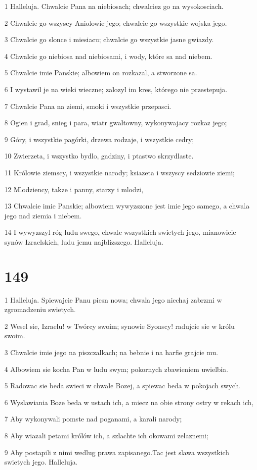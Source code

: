 \par 1 Halleluja. Chwalcie Pana na niebiosach; chwalciez go na wysokosciach.
\par 2 Chwalcie go wszyscy Aniolowie jego; chwalcie go wszystkie wojska jego.
\par 3 Chwalcie go slonce i miesiacu; chwalcie go wszystkie jasne gwiazdy.
\par 4 Chwalcie go niebiosa nad niebiosami, i wody, które sa nad niebem.
\par 5 Chwalcie imie Panskie; albowiem on rozkazal, a stworzone sa.
\par 6 I wystawil je na wieki wieczne; zalozyl im kres, którego nie przestepuja.
\par 7 Chwalcie Pana na ziemi, smoki i wszystkie przepasci.
\par 8 Ogien i grad, snieg i para, wiatr gwaltowny, wykonywajacy rozkaz jego;
\par 9 Góry, i wszystkie pagórki, drzewa rodzaje, i wszystkie cedry;
\par 10 Zwierzeta, i wszystko bydlo, gadziny, i ptastwo skrzydlaste.
\par 11 Królowie ziemscy, i wszystkie narody; ksiazeta i wszyscy sedziowie ziemi;
\par 12 Mlodziency, takze i panny, starzy i mlodzi,
\par 13 Chwalcie imie Panskie; albowiem wywyzszone jest imie jego samego, a chwala jego nad ziemia i niebem.
\par 14 I wywyzszyl róg ludu swego, chwale wszystkich swietych jego, mianowicie synów Izraelskich, ludu jemu najblizszego. Halleluja.

\chapter{149}

\par 1 Halleluja. Spiewajcie Panu piesn nowa; chwala jego niechaj zabrzmi w zgromadzeniu swietych.
\par 2 Wesel sie, Izraelu! w Twórcy swoim; synowie Syonscy! radujcie sie w królu swoim.
\par 3 Chwalcie imie jego na piszczalkach; na bebnie i na harfie grajcie mu.
\par 4 Albowiem sie kocha Pan w ludu swym; pokornych zbawieniem uwielbia.
\par 5 Radowac sie beda swieci w chwale Bozej, a spiewac beda w pokojach swych.
\par 6 Wyslawiania Boze beda w ustach ich, a miecz na obie strony ostry w rekach ich,
\par 7 Aby wykonywali pomste nad poganami, a karali narody;
\par 8 Aby wiazali petami królów ich, a szlachte ich okowami zelaznemi;
\par 9 Aby postapili z nimi wedlug prawa zapisanego.Tac jest slawa wszystkich swietych jego. Halleluja.

